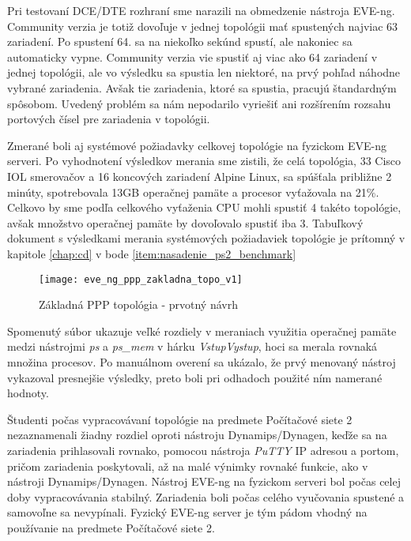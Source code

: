 Pri testovaní DCE/DTE rozhraní sme narazili na obmedzenie nástroja EVE-ng. Community verzia je totiž dovoľuje v jednej topológii mať spustených najviac 63 zariadení. Po spustení 64. sa na niekoľko sekúnd spustí, ale nakoniec sa automaticky vypne. Community verzia vie spustiť aj viac ako 64 zariadení v jednej topológii, ale vo výsledku sa spustia len niektoré, na prvý pohľad náhodne vybrané zariadenia. Avšak tie zariadenia, ktoré sa spustia, pracujú štandardným spôsobom. Uvedený problém sa nám nepodarilo vyriešiť ani rozšírením rozsahu portových čísel pre zariadenia v topológii.
  
Zmerané boli aj systémové požiadavky celkovej topológie na fyzickom EVE-ng serveri. Po vyhodnotení výsledkov merania sme zistili, že celá topológia, 33 Cisco IOL smerovačov a 16 koncových zariadení Alpine Linux, sa spúšťala približne 2 minúty, spotrebovala 13GB operačnej pamäte a procesor vyťažovala na 21\%. Celkovo by sme podľa celkového vyťaženia CPU mohli spustiť 4 takéto topológie, avšak množstvo operačnej pamäte by dovoľovalo spustiť iba 3. Tabuľkový dokument s výsledkami merania systémových požiadaviek topológie je prítomný v kapitole \ref{chap:cd} v bode \ref{item:nasadenie_ps2_benchmark}

\begin{figure}[htbp]
    \centering
    \texttt{[image: eve\_ng\_ppp\_zakladna\_topo\_v1]}
    \caption{Základná PPP topológia - prvotný návrh}
    \label{obr:eve_ng_ppp_zakladna_topo_v1}
\end{figure}

Spomenutý súbor ukazuje veľké rozdiely v meraniach využitia operačnej pamäte medzi nástrojmi \emph{ps} a \emph{ps\_mem} v hárku \emph{VstupVystup}, hoci sa merala rovnaká množina procesov. Po manuálnom overení sa ukázalo, že prvý menovaný nástroj vykazoval presnejšie výsledky, preto boli pri odhadoch použité ním namerané hodnoty.

Študenti počas vypracovávaní topológie na predmete Počítačové siete 2 nezaznamenali žiadny rozdiel oproti nástroju Dynamips/Dynagen, keďže sa na zariadenia prihlasovali rovnako, pomocou nástroja \emph{PuTTY} IP adresou a portom, pričom zariadenia poskytovali, až na malé výnimky rovnaké funkcie, ako v nástroji Dynamips/Dynagen. Nástroj EVE-ng na fyzickom serveri bol počas celej doby vypracovávania stabilný. Zariadenia boli počas celého vyučovania spustené a samovoľne sa nevypínali. Fyzický EVE-ng server je tým pádom vhodný na používanie na predmete Počítačové siete 2.






